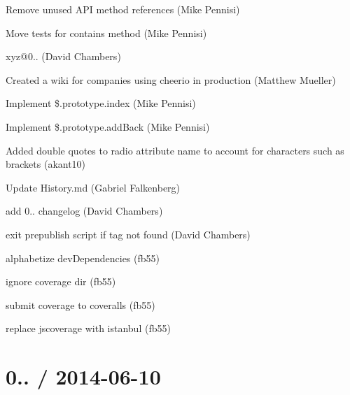 \begin{DoxyItemize}
\item Remove unused A\+PI method references (Mike Pennisi)
\item Move tests for {\ttfamily contains} method (Mike Pennisi)
\item xyz@0.. (David Chambers)
\item Created a wiki for companies using cheerio in production (Matthew Mueller)
\item Implement {\ttfamily \$.prototype.\+index} (Mike Pennisi)
\item Implement {\ttfamily \$.prototype.\+add\+Back} (Mike Pennisi)
\item Added double quotes to radio attribute name to account for characters such as brackets (akant10)
\item Update History.\+md (Gabriel Falkenberg)
\item add 0.. changelog (David Chambers)
\item exit prepublish script if tag not found (David Chambers)
\item alphabetize dev\+Dependencies (fb55)
\item ignore coverage dir (fb55)
\item submit coverage to coveralls (fb55)
\item replace jscoverage with istanbul (fb55)
\end{DoxyItemize}

\section*{0.. / 2014-\/06-\/10 }



